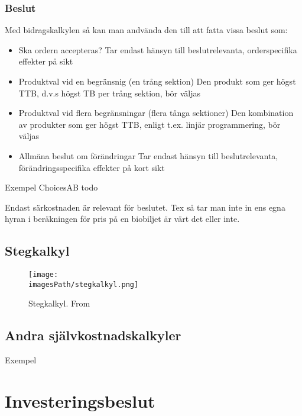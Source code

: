 \subsubsection{Beslut}
Med bidragskalkylen så kan man andvända den till att fatta vissa beslut som:
\begin{itemize}
    \item Ska ordern accepteras? \newline
    Tar endast hänsyn till beslutrelevanta, orderspecifika effekter på sikt
    \item Produktval vid en begränsnig (en trång sektion) \newline
    Den produkt som ger högst TTB, d.v.s högst TB per trång sektion, bör väljas
    \item Produktval vid flera begränsningar (flera tånga sektioner) \newline
    Den kombination av produkter som ger högst TTB, enligt t.ex. linjär programmering, bör väljas
    \item Allmäna beslut om förändringar \newline
    Tar endast hänsyn till beslutrelevanta, förändringsspecifika effekter på kort sikt
\end{itemize}


\begin{exampleblock}{Exempel ChoicesAB}
    todo
    
    Endast särkostnaden är relevant för beslutet. Tex så tar man inte in ens egna hyran i 
    beräkningen för pris på en biobiljet är värt det eller inte.
\end{exampleblock}

\subsection{Stegkalkyl}
\begin{figure}[!ht]
    \centering
    \texttt{[image: \\imagesPath/stegkalkyl.png]}
    \caption{Stegkalkyl. From \cite{}}
\end{figure}


\subsection{Andra självkostnadskalkyler}
Exempel

\section{Investeringsbeslut}

